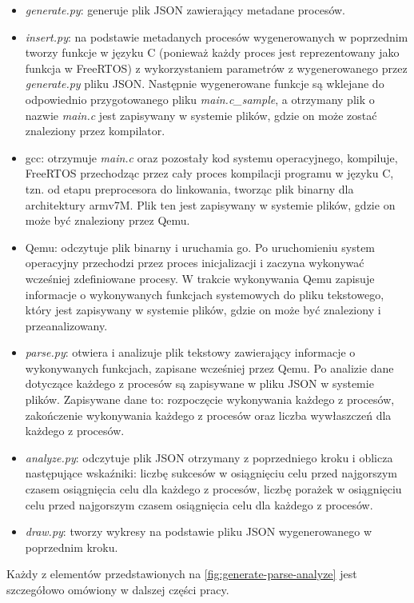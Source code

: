 \documentclass[../../main]{subfiles}
\begin{document}
\begin{itemize}
    \item \textit{generate.py}: generuje plik JSON zawierający metadane procesów.
    \item \textit{insert.py}: na podstawie metadanych procesów wygenerowanych w poprzednim tworzy funkcje w języku C (ponieważ każdy proces jest reprezentowany jako funkcja w FreeRTOS) z wykorzystaniem parametrów z wygenerowanego przez \textit{generate.py} pliku JSON. Następnie wygenerowane funkcje są wklejane do odpowiednio przygotowanego pliku \textit{main.c\_sample}, a otrzymany plik o nazwie \textit{main.c} jest zapisywany w systemie plików, gdzie on może zostać znaleziony przez kompilator.
    \item \gls{gcc}: otrzymuje \textit{main.c} oraz pozostały kod systemu operacyjnego, kompiluje, FreeRTOS przechodząc przez cały proces kompilacji programu w języku C, tzn. od etapu preprocesora do linkowania, tworząc plik binarny dla architektury \gls{arm}v7M. Plik ten jest zapisywany w systemie plików, gdzie on może być znaleziony przez Qemu.
    \item Qemu: odczytuje plik binarny i uruchamia go. Po uruchomieniu system operacyjny przechodzi przez proces inicjalizacji i zaczyna wykonywać wcześniej zdefiniowane procesy. W trakcie wykonywania Qemu zapisuje informacje o wykonywanych funkcjach systemowych do pliku tekstowego, który jest zapisywany w systemie plików, gdzie on może być znaleziony i przeanalizowany.
    \item \textit{parse.py}: otwiera i analizuje plik tekstowy zawierający informacje o wykonywanych funkcjach, zapisane wcześniej przez Qemu. Po analizie dane dotyczące każdego z procesów są zapisywane w pliku JSON w systemie plików. Zapisywane dane to: rozpoczęcie wykonywania każdego z procesów, zakończenie wykonywania każdego z procesów oraz liczba wywłaszczeń dla każdego z procesów.
    \item \textit{analyze.py}: odczytuje plik JSON otrzymany z poprzedniego kroku i oblicza następujące wskaźniki: liczbę sukcesów w osiągnięciu celu przed najgorszym czasem osiągnięcia celu dla każdego z procesów, liczbę porażek w osiągnięciu celu przed najgorszym czasem osiągnięcia celu dla każdego z procesów.
    \item \textit{draw.py}: tworzy wykresy na podstawie pliku JSON wygenerowanego w poprzednim kroku.
\end{itemize}

Każdy z elementów przedstawionych na \cref{fig:generate-parse-analyze} jest szczegółowo omówiony w dalszej części pracy.
\end{document}
